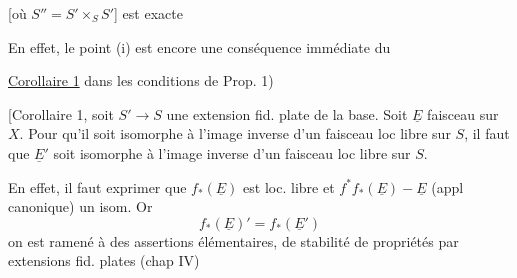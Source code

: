 [où $S''=S'\times_S S'$] est exacte 

 En effet, le point (i) est encore une conséquence immédiate du

\uline{Corollaire 1} dans les conditions de Prop. 1)

[Corollaire 1, soit $S'\to S$ une extension fid. plate  de la base. Soit $\underline E$ faisceau  sur $X$. Pour qu'il soit isomorphe à l'image inverse d'un faisceau loc libre  sur $S$, il faut que $\underline E'$ soit isomorphe à l'image inverse d'un faisceau loc libre sur $S$.

En effet, il faut exprimer que $f_*(\underline E)$ est loc. libre et \deleted{$\unsure{\xi}$} $f^*f_*(\underline E)-\underline E$ (appl canonique) un isom. Or
\[
f_*(\underline E)'=f_*(\underline E')
\]
on est ramené à des assertions élémentaires, de stabilité de propriétés par extensions fid. plates (chap IV)

